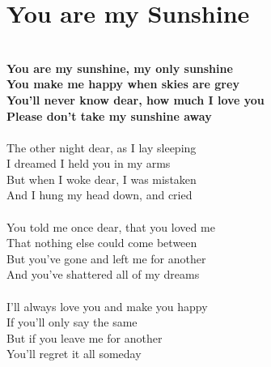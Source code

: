 \documentclass[letterpaper,14pt]{extarticle}
\begin{document}
\section{You are my Sunshine}
\noindent
\\\textbf{You are my sunshine, my only sunshine
\\You make me happy when skies are grey
\\You'll never know dear, how much I love you
\\Please don't take my sunshine away}
\\
\\The other night dear, as  I lay sleeping
\\I dreamed I held you in my arms
\\But when I woke dear, I was mistaken
\\And I hung my head down, and cried
\\
\\You told me once dear, that you loved me
\\That nothing else could come between
\\But you've gone and left me for another
\\And you've shattered all of my dreams
\\
\\I'll always love you and make you happy 
\\If you'll only say the same
\\But if you leave me for another
\\You'll regret it all someday
\end{document}
